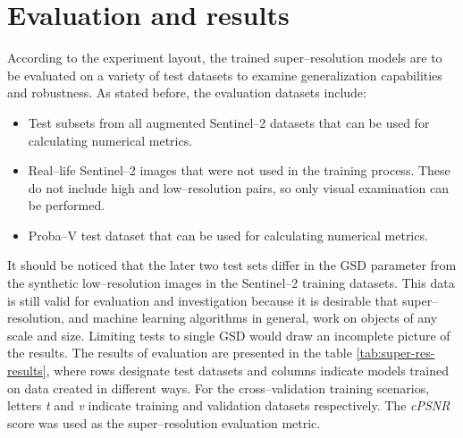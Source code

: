 \section{Evaluation and results}
According to the experiment layout, the trained super--resolution models are to be evaluated on a variety of test datasets to examine generalization capabilities and robustness.
As stated before, the evaluation datasets include:
\begin{itemize}
	\item Test subsets from all augmented Sentinel--2 datasets that can be used for calculating numerical metrics.
	\item Real--life Sentinel--2 images that were not used in the training process. These do not include high and low--resolution pairs, so only visual examination can be performed.
	\item Proba--V test dataset that can be used for calculating numerical metrics.
\end{itemize}
It should be noticed that the later two test sets differ in the GSD parameter from the synthetic low--resolution images in the Sentinel--2 training datasets.
This data is still valid for evaluation and investigation because it is desirable that super--resolution, and machine learning algorithms in general, work on objects of any scale and size.
Limiting tests to single GSD would draw an incomplete picture of the results.
The results of evaluation are presented in the table \ref{tab:super-res-results}, where rows designate test datasets and columns indicate models trained on data created in different ways.
For the cross--validation training scenarios, letters \textit{t} and \textit{v} indicate training and validation datasets respectively.
The \textit{cPSNR} score was used as the super--resolution evaluation metric.

